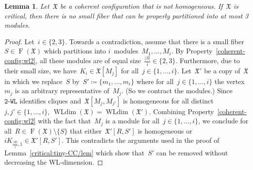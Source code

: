 \documentclass[english,a4paper]{article}
\theoremstyle{plain}
\newtheorem{lemma}      [theorem]{Lemma}
\theoremstyle{definition}
\newcommand{\abs}[1]{| #1 |}
\DeclareMathOperator{\Fibers}{F}
\newcommand{\coherentConfig}{\ensuremath{\mathfrak{X}}}
\newcommand{\fibers}[1]{\ensuremath{\Fibers \left( #1 \right)}}
\newcommand{\interspace}[2]{\ensuremath{\coherentConfig[#1,#2]}}
\DeclareMathOperator*{\WLdim}{WLdim}
\newcommand{\wldim}[1]{\ensuremath{\WLdim\left(#1\right)}}
\newcommand{\wld}[1]{\texttt{#1-WL}}
\newcommand{\wltwo}{\wld{2}\xspace}
\newcommand{\clique}[1]{\ensuremath{K_{#1}}}
\newcommand{\disjointCliques}[2]{\ensuremath{#1 \clique{#2}}}
\begin{document}
\begin{lemma}
\label{critical:small-cc:module/lem}
    Let~$\coherentConfig$ be a coherent configuration that is not homogeneous.
    If~$\coherentConfig$ is critical, then there is no small fiber that can be properly partitioned into at most 3 modules.
\end{lemma}
\begin{proof}
    Let~$i \in \{2,3\}$.
    Towards a contradiction, assume that there is a small fiber~$S \in \fibers{\coherentConfig}$ which partitions into $i$~modules~$M_1,\dots,M_i$.
    By Property~\ref{coherent-config:wl2}, all these modules are of equal size~$\frac{\abs{S}}{i} \in \{2,3\}$.
    Furthermore, due to their small size, we have~$K_i \in \coherentConfig[M_j]$ for all~$j \in \{1,\dots,i\}$.
    Let~$\coherentConfig'$ be a copy of~$\coherentConfig$ in which we replace~$S$ by~$S' \coloneqq \{m_1,\dots,m_i\}$ where for all~$j \in \{1,\dots,i\}$ the vertex~$m_j$ is an arbitrary representative of~$M_j$. (So we contract the modules.)
    Since~$\wltwo$ identifies cliques and~$\interspace{M_j}{M_{j'}}$ is homogeneous for all distinct~$j,j' \in \{1,\dots,i\}$, $\wldim{\coherentConfig} = \wldim{\coherentConfig'}$.
    Combining Property~\ref{coherent-config:wl2} with the fact that~$M_j$ is a module for all~$j \in \{1,\dots,i\}$, we conclude for all~$R \in \fibers{\coherentConfig} \setminus \{S\}$ that either~$\coherentConfig'[R,S']$ is homogeneous or~$\disjointCliques{i}{\frac{\abs{R}}{i},1} \in \coherentConfig'[R,S']$.
    This contradicts the arguments used in the proof of Lemma~\ref{critical:tiny-CC/lem} which show that~$S'$ can be removed without decreasing the WL-dimension.
\end{proof}
\end{document}
